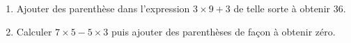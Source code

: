 
\begin{exercice}\label{exosmath-0731}

    \begin{enumerate}
        \item
            
Ajouter des parenthèse dans l'expression \( 3\times 9+3\) de telle sorte à obtenir \( 36\).
\item
Calculer \( 7\times 5-5\times 3\) puis ajouter des parenthèses de façon à obtenir zéro.

    \end{enumerate}
\end{exercice}
